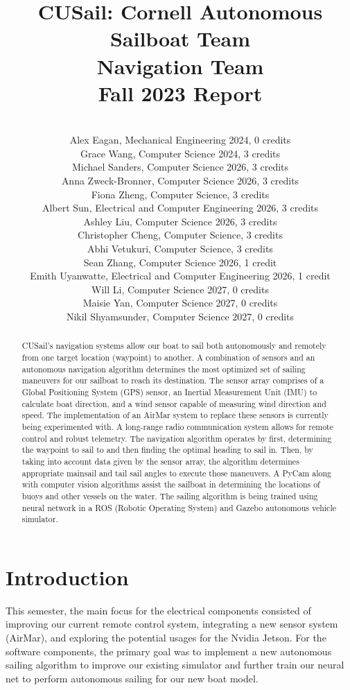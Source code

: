 \documentclass{article}
\title{CUSail: Cornell Autonomous Sailboat Team \\ \textbf{Navigation Team}\\ Fall 2023 Report}
\author{
\\ Alex Eagan, Mechanical Engineering 2024, 0 credits
\\ Grace Wang, Computer Science 2024, 3 credits
\\ Michael Sanders, Computer Science 2026, 3 credits
\\ Anna Zweck-Bronner, Computer Science 2026, 3 credits
\\ Fiona Zheng, Computer Science, 3 credits
\\ Albert Sun, Electrical and Computer Engineering 2026, 3 credits
\\ Ashley Liu, Computer Science 2026, 3 credits
\\ Christopher Cheng, Computer Science, 3 credits
\\ Abhi Vetukuri, Computer Science, 3 credits
\\ Sean Zhang, Computer Science 2026, 1 credit
\\ Emith Uyanwatte, Electrical and Computer Engineering 2026, 1 credit
\\ Will Li, Computer Science 2027, 0 credits
\\ Maisie Yan, Computer Science 2027, 0 credits
\\ Nikil Shyamsunder, Computer Science 2027, 0 credits
}
\begin{document}
\maketitle
\clearpage
\begin{changemargin}{1.5cm}{1.5cm} 

\begin{abstract}
CUSail's navigation systems allow our boat to sail both autonomously and remotely from one target location (waypoint) to another. A combination of sensors and an autonomous navigation algorithm determines the most optimized set of sailing maneuvers for our sailboat to reach its destination. The sensor array comprises
of a Global Positioning System (GPS) sensor, an Inertial Measurement Unit (IMU) to calculate boat direction, and a wind sensor capable of measuring wind direction and speed. The implementation of an AirMar system to replace these sensors is currently being experimented with. A long-range radio communication system allows for remote control and robust telemetry. The navigation algorithm operates by first, determining the waypoint to sail to and then finding the optimal heading to sail in. Then, by taking into account data given by the sensor array, the algorithm determines appropriate mainsail and tail sail angles to execute those maneuvers. A PyCam along with computer vision algorithms assist the sailboat in determining the locations of buoys and other vessels on the water. The sailing algorithm is being trained using neural network in a ROS (Robotic Operating System) and Gazebo autonomous vehicle simulator. 

\end{abstract}
\clearpage
\tableofcontents
\end{changemargin}
\newpage

\twocolumn

\section{Introduction}
This semester, the main focus for the electrical components consisted of improving our current remote control system, integrating a new sensor system (AirMar), and exploring the potential usages for the Nvidia Jetson. For the software components, the primary goal was to implement a new autonomous sailing algorithm to improve our existing simulator and further train our neural net to perform autonomous sailing for our new boat model. 
\end{document}
